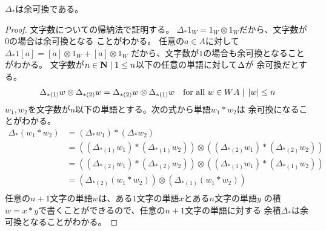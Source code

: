 	\begin{proposition}\label{prop:Delta_*は余可換} %
		$\Delta_*$は余可換である。
	\end{proposition} %
	\begin{proof} %
		文字数についての帰納法で証明する。
		$\Delta_*1_W=1_W\otimes 1_W$だから、文字数が$0$の場合は余可換となる
		ことがわかる。
		任意の$a\in A$に対して$\Delta_*1[a]=[a]\otimes 1_W+[a]\otimes 1_W$
		だから、文字数が$1$の場合も余可換となることがわかる。
		文字数が$n\in{\mathbf{N}}\;\vert\; 1\le n$以下の任意の単語に対して$\Delta\*$が
		余可換だとする。
		\begin{equation*}\begin{split} %
			\Delta_{*(1)}w\otimes\Delta_{*(2)}w
			=\Delta_{*(2)}w\otimes\Delta_{*(1)}w
			\quad\text{for all }w\in WA\bou \zettai{w}\le n
		\end{split}\end{equation*} %
		$w_1,w_2$を文字数が$n$以下の単語とする。次の式から単語$w_1*w_2$は
		余可換になることがわかる。
		\begin{equation*}\begin{split} %
			\Delta_*(w_1*w_2) &= (\Delta_*w_1)*(\Delta_*w_2) \\
			&= \left((\Delta_{*(1)}w_1)*(\Delta_{*(1)}w_2)\right)
			\otimes \left((\Delta_{*(2)}w_1)*(\Delta_{*(2)}w_2)\right) \\
			&= \left((\Delta_{*(2)}w_1)*(\Delta_{*(2)}w_2)\right)
			\otimes \left((\Delta_{*(1)}w_1)*(\Delta_{*(1)}w_2)\right) \\
			& = \left(\Delta_{*(2)}(w_1*w_2)\right)
			\otimes \left(\Delta_{*(1)}(w_1*w_2)\right) \\
		\end{split}\end{equation*} %
		任意の$n+1$文字の単語$w$は、ある$1$文字の単語$x$とある$n$文字の単語$y$
		の積$w=x*y$で書くことができるので、任意の$n+1$文字の単語に対する
		余積$\Delta_*$は余可換となることがわかる。
	\end{proof} %

